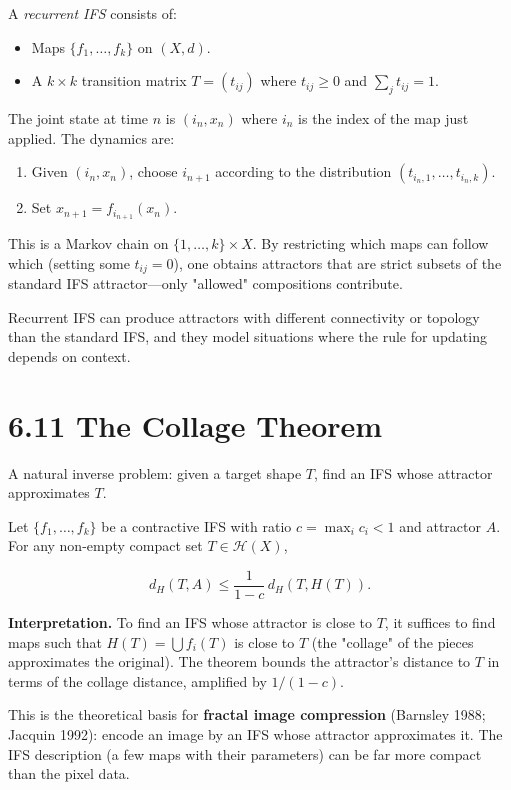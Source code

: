 \begin{definition}
A \textit{recurrent IFS} consists of:
\end{definition}

\begin{itemize}
  \item Maps $\{ f_1, \ldots, f_k\} $ on $(X, d)$.
  \item A $k \times k$ transition matrix $T = (t_{ij})$ where $t_{ij} \ge 0$ and $\sum_j t_{ij} = 1$.
\end{itemize}

The joint state at time $n$ is $(i_n, x_n)$ where $i_n$ is the index of the map just applied. The dynamics are:

\begin{enumerate}
  \item Given $(i_n, x_n)$, choose $i_{n+1}$ according to the distribution $(t_{i_n, 1}, \ldots, t_{i_n, k})$.
  \item Set $x_{n+1} = f_{i_{n+1}}(x_n)$.
\end{enumerate}

This is a Markov chain on $\{ 1, \ldots, k\}  \times X$. By restricting which maps can follow which (setting some $t_{ij} = 0$), one obtains attractors that are strict subsets of the standard IFS attractor—only "allowed" compositions contribute.

Recurrent IFS can produce attractors with different connectivity or topology than the standard IFS, and they model situations where the rule for updating depends on context.

\section{6.11 The Collage Theorem}

A natural inverse problem: given a target shape $T$, find an IFS whose attractor approximates $T$.

\begin{theorem}
Let $\{ f_1, \ldots, f_k\} $ be a contractive IFS with ratio $c = \max_i c_i < 1$ and attractor $A$. For any non-empty compact set $T \in \mathcal{H}(X)$,

\[
d_H(T, A) \le \frac{1}{1 - c} \, d_H(T, H(T)).
\]

\textbf{Interpretation.} To find an IFS whose attractor is close to $T$, it suffices to find maps such that $H(T) = \bigcup f_i(T)$ is close to $T$ (the "collage" of the pieces approximates the original). The theorem bounds the attractor's distance to $T$ in terms of the collage distance, amplified by $1/(1-c)$.

This is the theoretical basis for \textbf{fractal image compression} (Barnsley 1988; Jacquin 1992): encode an image by an IFS whose attractor approximates it. The IFS description (a few maps with their parameters) can be far more compact than the pixel data.
\end{theorem}

